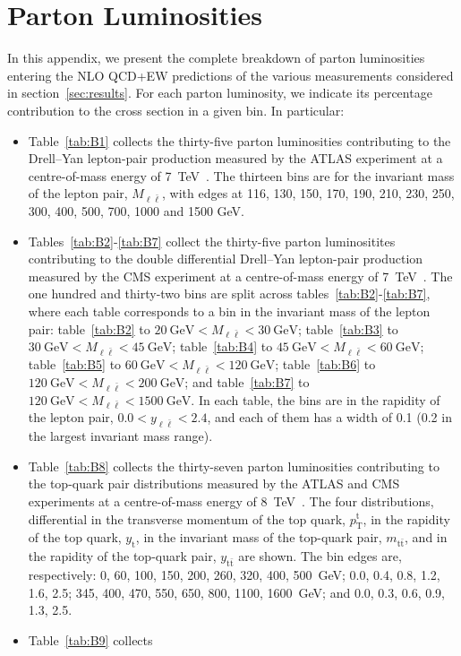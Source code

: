 \section{Parton Luminosities}
\label{app:lumis}

In this appendix, we present the complete breakdown of parton luminosities
entering the NLO QCD+EW predictions of the various measurements
considered in section~\ref{sec:results}. For each parton luminosity,
we indicate its percentage contribution to the cross section in a given bin.
In particular:
\begin{itemize}
\item Table~\ref{tab:B1} collects the thirty-five parton luminosities
  contributing to the Drell--Yan lepton-pair production measured by the
  ATLAS experiment at a centre-of-mass energy of
  \SI{7}{\tera\electronvolt}~\cite{Aad:2013iua}.
  The thirteen bins are for the invariant mass of the lepton pair,
  $M_{\ell\bar\ell}$, with edges at 116, 130, 150, 170, 190,
  210, 230, 250, 300, 400, 500, 700, 1000 and 1500 GeV.
\item Tables~\ref{tab:B2}-\ref{tab:B7} collect the thirty-five parton
  luminositites contributing to the double differential Drell--Yan lepton-pair
  production measured by the CMS experiment at a centre-of-mass energy of
  \SI{7}{\tera\electronvolt}~\cite{Aad:2013iua}. The one hundred and thirty-two
  bins are split across tables~\ref{tab:B2}-\ref{tab:B7}, where each table
  corresponds to a bin in the invariant mass of the lepton pair:
  table~\ref{tab:B2} to  $\SI{20}{\giga\electronvolt}<M_{\ell\bar\ell}<\SI{30}{\giga\electronvolt}$; table~\ref{tab:B3} to  $\SI{30}{\giga\electronvolt}<M_{\ell\bar\ell}<\SI{45}{\giga\electronvolt}$; table~\ref{tab:B4} to  $\SI{45}{\giga\electronvolt}<M_{\ell\bar\ell}<\SI{60}{\giga\electronvolt}$; table~\ref{tab:B5} to  $\SI{60}{\giga\electronvolt}<M_{\ell\bar\ell}<\SI{120}{\giga\electronvolt}$; table~\ref{tab:B6} to $\SI{120}{\giga\electronvolt}<M_{\ell\bar\ell}<\SI{200}{\giga\electronvolt}$; and table~\ref{tab:B7} to $\SI{120}{\giga\electronvolt}<M_{\ell\bar\ell}<\SI{1500}{\giga\electronvolt}$. In each table, the bins are in the rapidity of the lepton pair, $0.0<y_{\ell\bar\ell}<2.4$, and each of them has a width of 0.1 (0.2 in the largest invariant mass range).
\item Table~\ref{tab:B8} collects the thirty-seven parton luminosities
  contributing to the top-quark pair distributions measured by the ATLAS and
  CMS experiments at a centre-of-mass energy of
  \SI{8}{\tera\electronvolt}~\cite{Aad:2015mbv,Khachatryan:2015oqa}.
  The four distributions, differential in the transverse momentum of the top
  quark,  $p_\mathrm{T}^\mathrm{t}$, in the rapidity of the top quark,
  $y_\mathrm{t}$, in the invariant mass of the top-quark pair,
  $m_{\mathrm{t}\bar{\mathrm{t}}}$, and in the rapidity of the top-quark pair,
  $y_{\mathrm{t}\bar{\mathrm{t}}}$ are shown. The bin edges are, respectively:
  0, 60, 100, 150, 200, 260, 320, 400, 500~GeV; 0.0, 0.4, 0.8, 1.2, 1.6, 2.5;
  345, 400, 470, 550, 650, 800, 1100, 1600~GeV;
  and 0.0, 0.3, 0.6, 0.9, 1.3, 2.5.
\item Table~\ref{tab:B9} collects 
\end{itemize}

